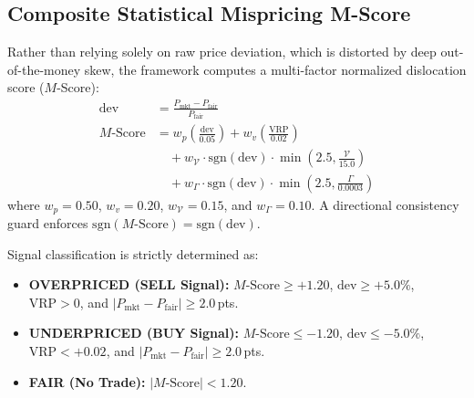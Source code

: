 \documentclass[journal]{IEEEtran}
\begin{document}
\subsection{Composite Statistical Mispricing M-Score}
Rather than relying solely on raw price deviation, which is distorted by deep out-of-the-money skew, the framework computes a multi-factor normalized dislocation score ($M$-Score):
\begin{equation}
\begin{aligned}
\mathrm{dev} &= \frac{P_{\mathrm{mkt}} - P_{\mathrm{fair}}}{P_{\mathrm{fair}}} \\
M\text{-Score} &= w_p \left( \frac{\mathrm{dev}}{0.05} \right) + w_v \left( \frac{\mathrm{VRP}}{0.02} \right) \\
&\quad + w_{\mathcal{V}} \cdot \mathrm{sgn}(\mathrm{dev}) \cdot \min\left(2.5, \frac{\mathcal{V}}{15.0}\right) \\
&\quad + w_{\Gamma} \cdot \mathrm{sgn}(\mathrm{dev}) \cdot \min\left(2.5, \frac{\Gamma}{0.0003}\right)
\end{aligned}
\end{equation}
where $w_p = 0.50$, $w_v = 0.20$, $w_{\mathcal{V}} = 0.15$, and $w_{\Gamma} = 0.10$. A directional consistency guard enforces $\mathrm{sgn}(M\text{-Score}) = \mathrm{sgn}(\mathrm{dev})$.

Signal classification is strictly determined as:
\begin{itemize}
    \item \textbf{OVERPRICED (SELL Signal):} $M\text{-Score} \ge +1.20$, $\mathrm{dev} \ge +5.0\%$, $\mathrm{VRP} > 0$, and $|P_{\mathrm{mkt}} - P_{\mathrm{fair}}| \ge 2.0$\,pts.
    \item \textbf{UNDERPRICED (BUY Signal):} $M\text{-Score} \le -1.20$, $\mathrm{dev} \le -5.0\%$, $\mathrm{VRP} < +0.02$, and $|P_{\mathrm{mkt}} - P_{\mathrm{fair}}| \ge 2.0$\,pts.
    \item \textbf{FAIR (No Trade):} $|M\text{-Score}| < 1.20$.
\end{itemize}
\end{document}
